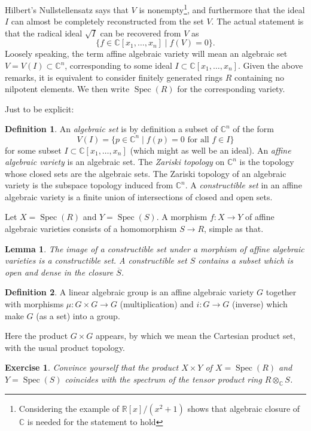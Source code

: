 \documentclass[12pt]{article}
\theoremstyle{plain}
\newtheorem{lemma}[thm]{Lemma}
\newtheorem{exer}[thm]{Exercise}
\theoremstyle{definition}
\newtheorem{defn}{Definition}[section]
\numberwithin{equation}{section}
\DeclareMathOperator{\spec}{Spec}
\newcommand{\ov}[1]{\overline#1}
\newcommand{\C}{\mathbb{C}}
\newcommand{\R}{\mathbb{R}}
\begin{document}
Hilbert's Nullstellensatz says that $V$ is nonempty\footnote{Considering the example of $\R[x] / (x^2+1)$ shows that algebraic closure of $\C$ is needed for the statement to hold}, and furthermore that the ideal $I$ can almost be completely reconstructed from the set $V$. The actual statement is that the radical ideal $\sqrt{I}$ can be recovered from $V$ as
\[
\{f \in \C[x_1, \ldots, x_n] \mid f(V) = 0\}.
\]
Loosely speaking, the term affine algebraic variety will mean an algebraic set $V = V(I) \subset \C^n$, corresponding to some ideal $I \subset \C[x_1, \ldots, x_n]$. Given the above remarks, it is equivalent to consider finitely generated rings $R$ containing no nilpotent elements. We then write $\spec(R)$ for the corresponding variety.

Just to be explicit:
\begin{defn}
An \emph{algebraic set} is by definition a subset of $\C^n$ of the form
\[
V(I) = \{p \in \C^n \mid \text{$f(p) = 0$ for all $f \in I$}\}
\]
for some subset $I \subset \C[x_1, \ldots, x_n]$ (which might as well be an ideal). An \emph{affine algebraic variety} is an algebraic set. The \emph{Zariski topology} on $\C^n$ is the topology whose closed sets are the algebraic sets. The Zariski topology of an algebraic variety is the subspace topology induced from $\C^n$. A \emph{constructible set} in an affine algebraic variety is a finite union of intersections of closed and open sets.
\end{defn}


Let $X = \spec(R)$ and $Y = \spec(S)$. A morphism $f : X \rightarrow Y$ of affine algebraic varieties consists of a homomorphism $S \rightarrow R$, simple as that.

\begin{lemma}
The image of a constructible set under a morphism of affine algebraic varieties is a constructible set. A constructible set $S$ contains a subset which is open and dense in the closure $\ov S$.
\end{lemma}


\begin{defn}
A linear algebraic group is an affine algebraic variety $G$ together with morphisms $\mu : G \times G \rightarrow G$ (multiplication) and $i : G \rightarrow G$ (inverse) which make $G$ (as a set) into a group.
\end{defn}
Here the product $G \times G$ appears, by which we mean the Cartesian product set, with the usual product topology.
\begin{exer}
Convince yourself that the product $X \times Y$ of $X = \spec(R)$ and $Y = \spec(S)$ coincides with the spectrum of the tensor product ring $R \otimes_\C S$.
\end{exer}
\end{document}
